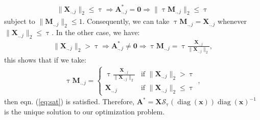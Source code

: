 \documentclass[11pt,onside]{article}
\DeclareMathOperator{\diag}{diag}
\begin{document}
\begin{description}
\begin{align*}
\|\bm{X}_{.,j}\|_2\leq \uptau \Rightarrow \bm{A}^\ast_{.,j}=\bm{0} \Rightarrow \|\uptau\bm{M}_{.,j}\|_2\leq \uptau
\end{align*}
subject to $\|\bm{M}_{.,j}\|_2\leq 1$. Consequently, we can take $\uptau\bm{M}_{.,j}=\bm{X}_{.,j}$ whenever $\|\bm{X}_{.,j}\|_2\leq \uptau$. In the other case, we have:
\begin{align*}
\|\bm{X}_{.,j}\|_2> \uptau\Rightarrow\bm{A}^\ast_{.,j}\neq\bm{0} \Rightarrow \uptau\bm{M}_{.,j}=\uptau\frac{\bm{X}_{.,j}}{\|\bm{X}_{.,j}\|_2},
\end{align*}
this shows that if we take:
\begin{align*}
\uptau\bm{M}_{.,j}=\begin{cases} \uptau\frac{\bm{X}_{.,j}}{\|\bm{X}_{.,j}\|_2}&\mbox{if } \|\bm{X}_{.,j}\|_2>\uptau \\
\bm{X}_{.,j}& \mbox{if } \|\bm{X}_{.,j}\|_2\leq \uptau
\end{cases},
\end{align*}
then eqn. (\ref{eq:sat}) is satisfied. Therefore, $\bm{A}^\ast=\bm{X}\mathcal{S}_{\uptau}(\diag(\bm{x}))\diag(\bm{x})^{-1}$ is the unique solution to our optimization problem.\\
\end{description}
\end{document}
